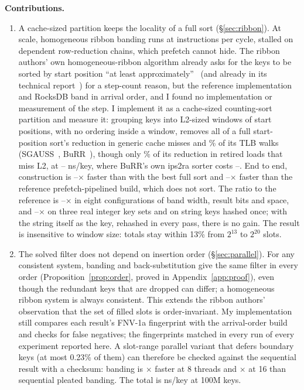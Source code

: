 \documentclass{article}
\begin{document}
\textbf{Contributions.}
\begin{enumerate}
\item A cache-sized partition keeps the locality of a full sort (\S\ref{sec:ribbon}). At scale, homogeneous ribbon banding runs at \esevenrefipc{} instructions per cycle, stalled on dependent row-reduction chains, which prefetch cannot hide. The ribbon authors' own homogeneous-ribbon algorithm already asks for the keys to be sorted by start position ``at least approximately''~\citep{dietzfelbinger2026ribbon} (and already in its technical report~\citep{dillinger2021burrtr}) for a step-count reason, but the reference implementation and RocksDB band in arrival order, and I found no implementation or measurement of the step. I implement it as a cache-sized counting-sort partition and measure it: grouping keys into L2-sized windows of start positions, with no ordering inside a window, removes all of a full start-position sort's reduction in generic cache misses and \esevenrectlbcent\% of its TLB walks (SGAUSS~\citep{dietzfelbinger2019gauss}, BuRR~\citep{dillinger2022burr}), though only \esevenrecltwocent\% of its reduction in retired loads that miss L2, at \esevenpartreordercent--\esevenpartreorderfour{} ns/key, where BuRR's own ips2ra sorter costs \esevenipsreorderfour--\esevenipsreordercent. End to end, construction is \esevensortpartfour--\esevensortpartcent$\times$ faster than with the best full sort and \esevenrefpartcent--\esevenrefpartfour$\times$ faster than the reference prefetch-pipelined build, which does not sort. The ratio to the reference is \esevenconfigmin--\esevenconfigmax$\times$ in eight configurations of band width, result bits and space, and \esevenkeysmin--\esevenkeysmax$\times$ on three real integer key sets and on string keys hashed once; with the string itself as the key, rehashed in every pass, there is no gain. The result is insensitive to window size: totals stay within 13\% from $2^{13}$ to $2^{20}$ slots.
\item The solved filter does not depend on insertion order (\S\ref{sec:parallel}). For any consistent system, banding and back-substitution give the same filter in every order (Proposition~\ref{prop:order}, proved in Appendix~\ref{app:proof}), even though the redundant keys that are dropped can differ; a homogeneous ribbon system is always consistent. This extends the ribbon authors' observation that the set of filled slots is order-invariant. My implementation still compares each result's FNV-1a fingerprint with the arrival-order build and checks for false negatives; the fingerprints matched in every run of every experiment reported here. A slot-range parallel variant that defers boundary keys (at most 0.23\% of them) can therefore be checked against the sequential result with a checksum: banding is \esevenparbandeight$\times$ faster at 8 threads and \esevenparbandsixteen$\times$ at 16 than sequential pleated banding. The total is \esevenpartotalsixteen{} ns/key at 100M keys.

\end{enumerate}
\end{document}
